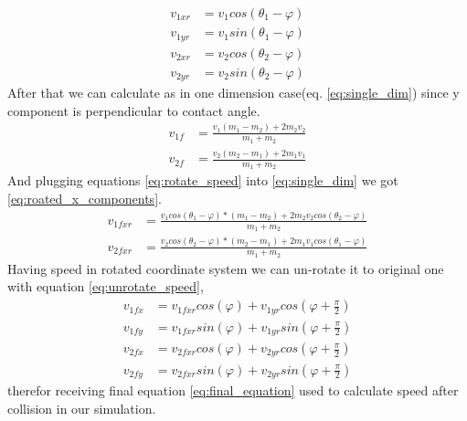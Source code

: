 \documentclass[]{report}
\begin{document}
\begin{equation}
\begin{aligned}
\label{eq:rotate_speed}
	v_{1xr} &= v_1 cos(\theta_1 - \varphi) \\
	v_{1yr} &= v_1 sin(\theta_1 - \varphi) \\
	v_{2xr} &= v_2 cos(\theta_2 - \varphi) \\
	v_{2yr} &= v_2 sin(\theta_2 - \varphi) 
\end{aligned}
\end{equation}
After that we can calculate as in one dimension case(eq. \ref{eq:single_dim}) since y component is perpendicular to contact angle.
\begin{equation}
\begin{aligned}
\label{eq:single_dim}
v_{1f} &= \frac{v_1(m_1-m_2) + 2m_2v_2}{m_1+m_2} \\
v_{2f} &= \frac{v_2(m_2-m_1) + 2m_1v_1}{m_1+m_2}
\end{aligned}
\end{equation}
And plugging equations \ref{eq:rotate_speed} into \ref{eq:single_dim} we got \ref{eq:roated_x_components}.
\begin{equation}
\begin{aligned}
\label{eq:roated_x_components}
v_{1fxr} &= \frac{v_1 cos(\theta_1 - \varphi)*(m_1-m_2) + 2m_2 v_2 cos(\theta_2 - \varphi)}{m_1+m_2} \\
v_{2fxr} &= \frac{v_2 cos(\theta_2 - \varphi)*(m_2-m_1) + 2m_1 v_1 cos(\theta_1 - \varphi)}{m_1+m_2}
\end{aligned}
\end{equation}
Having speed in rotated coordinate system we can un-rotate it to original one with equation \ref{eq:unrotate_speed},
\begin{equation}
\begin{aligned}
\label{eq:unrotate_speed}
v_{1fx} &= v_{1fxr} cos(\varphi) + v_{1yr} cos(\varphi + \frac{\pi}{2}) \\
v_{1fy} &= v_{1fxr} sin(\varphi) + v_{1yr} sin(\varphi + \frac{\pi}{2}) \\
v_{2fx} &= v_{2fxr} cos(\varphi) + v_{2yr} cos(\varphi + \frac{\pi}{2}) \\
v_{2fy} &= v_{2fxr} sin(\varphi) + v_{2yr} sin(\varphi + \frac{\pi}{2}) 
\end{aligned}
\end{equation}
therefor receiving final equation \ref{eq:final_equation} used to calculate speed after collision in our simulation.
\end{document}
